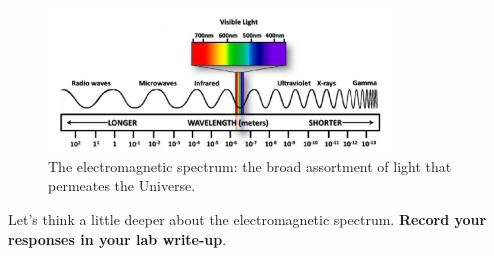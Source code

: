 \documentclass[11pt]{article}
\begin{document}
\begin{figure}
    \centering
    \includegraphics[width=0.8\textwidth]{Figures/emspectrum.png}
    \caption{The electromagnetic spectrum: the broad assortment of light that permeates the Universe.}
    \label{fig:spectrum}
\end{figure}
\medskip
\noindent
Let's think a little deeper about the electromagnetic spectrum. \textbf{Record your responses in your lab write-up}.
\end{document}
